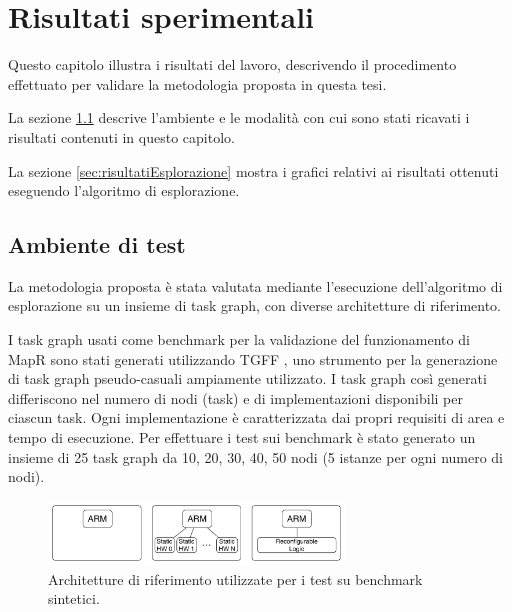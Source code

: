 \chapter{Risultati sperimentali}
\label{chap:risultati}
\vspace{1cm}
Questo capitolo illustra i risultati del lavoro, descrivendo
il procedimento effettuato per validare la metodologia proposta
in questa tesi.

La sezione \ref{sec:ambienteTest} descrive l'ambiente e le
modalit\`a con cui sono stati ricavati i risultati contenuti
in questo capitolo.

La sezione \ref{sec:risultatiEsplorazione} mostra i grafici relativi
ai risultati ottenuti eseguendo l'algoritmo di esplorazione.

\newpage

\section{Ambiente di test}
\label{sec:ambienteTest}

La metodologia proposta \`e stata valutata mediante l'esecuzione
dell'algoritmo di esplorazione su un insieme di task graph,
con diverse architetture di riferimento.

I task graph usati come benchmark per la validazione del funzionamento di
MapR sono stati generati utilizzando \ac{TGFF} \cite{tgff}, uno strumento per
la generazione di task graph pseudo-casuali ampiamente utilizzato.
I task graph cos\`i generati differiscono nel numero di nodi (task) e di implementazioni
disponibili per ciascun task. Ogni implementazione \`e caratterizzata dai propri requisiti
di area e tempo di esecuzione. Per effettuare i test sui benchmark \`e stato generato un insieme di 25 task graph da
10, 20, 30, 40, 50 nodi (5 istanze per ogni numero di nodi).

\begin{figure}[t]
  \begin{center}
    \includegraphics[width=0.7\textwidth]{./capitoli/figure/cap6/templates.pdf}
    \caption{Architetture di riferimento utilizzate per i test su benchmark sintetici.}
    \label{fig:architettureTestSintetici}
  \end{center}
\end{figure}

